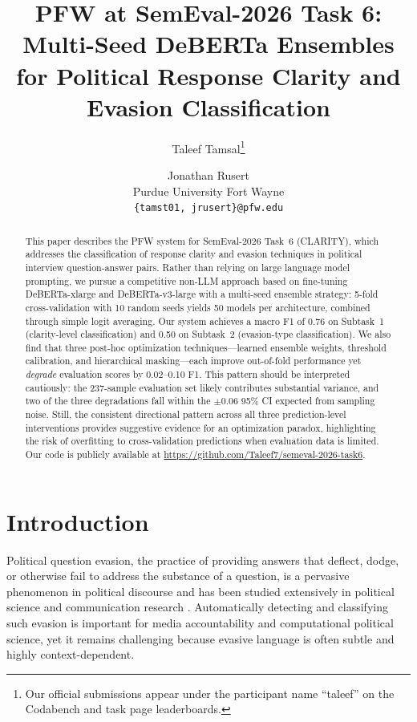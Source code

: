 \documentclass[11pt]{article}
\title{PFW at SemEval-2026 Task 6: Multi-Seed DeBERTa Ensembles for Political Response Clarity and Evasion Classification}
\author{Taleef Tamsal\thanks{Our official submissions appear under the participant name ``taleef'' on the Codabench and task page leaderboards.} \and Jonathan Rusert \\
  Purdue University Fort Wayne \\
  \texttt{\{tamst01, jrusert\}@pfw.edu}}
\begin{document}
\maketitle

\begin{abstract}
This paper describes the PFW system for SemEval-2026 Task~6 (CLARITY), which addresses the classification of response clarity and evasion techniques in political interview question-answer pairs.
Rather than relying on large language model prompting, we pursue a competitive non-LLM approach based on fine-tuning DeBERTa-xlarge and DeBERTa-v3-large with a multi-seed ensemble strategy: 5-fold cross-validation with 10 random seeds yields 50 models per architecture, combined through simple logit averaging.
Our system achieves a macro F1 of 0.76 on Subtask~1 (clarity-level classification) and 0.50 on Subtask~2 (evasion-type classification).
We also find that three post-hoc optimization techniques---learned ensemble weights, threshold calibration, and hierarchical masking---each improve out-of-fold performance yet \emph{degrade} evaluation scores by 0.02--0.10 F1. This pattern should be interpreted cautiously: the 237-sample evaluation set likely contributes substantial variance, and two of the three degradations fall within the $\pm$0.06 95\% CI expected from sampling noise. Still, the consistent directional pattern across all three prediction-level interventions provides suggestive evidence for an optimization paradox, highlighting the risk of overfitting to cross-validation predictions when evaluation data is limited.
Our code is publicly available at \url{https://github.com/Taleef7/semeval-2026-task6}.
\end{abstract}

\section{Introduction}

Political question evasion, the practice of providing answers that deflect, dodge, or otherwise fail to address the substance of a question, is a pervasive phenomenon in political discourse and has been studied extensively in political science and communication research \citep{bull2003microanalysis, clayman2001answers, harris1991evasive}. Automatically detecting and classifying such evasion is important for media accountability and computational political science, yet it remains challenging because evasive language is often subtle and highly context-dependent.
\end{document}
